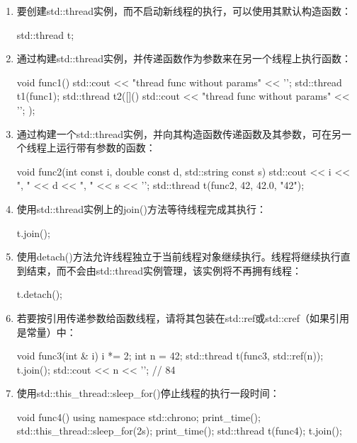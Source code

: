 \begin{enumerate}
\item
要创建std::thread实例，而不启动新线程的执行，可以使用其默认构造函数：

\begin{cpp}
std::thread t;
\end{cpp}

\item
通过构建std::thread实例，并传递函数作为参数来在另一个线程上执行函数：

\begin{cpp}
void func1()
{
    std::cout << "thread func without params" << '\n';
}
std::thread t1(func1);
std::thread t2([]() {
    std::cout << "thread func without params" << '\n'; });
\end{cpp}

\item
通过构建一个std::thread实例，并向其构造函数传递函数及其参数，可在另一个线程上运行带有参数的函数：

\begin{cpp}
void func2(int const i, double const d, std::string const s)
{
    std::cout << i << ", " << d << ", " << s << '\n';
}
std::thread t(func2, 42, 42.0, "42");
\end{cpp}

\item
使用std::thread实例上的join()方法等待线程完成其执行：

\begin{cpp}
t.join();
\end{cpp}

\item
使用detach()方法允许线程独立于当前线程对象继续执行。线程将继续执行直到结束，而不会由std::thread实例管理，该实例将不再拥有线程：

\begin{cpp}
t.detach();
\end{cpp}

\item
若要按引用传递参数给函数线程，请将其包装在std::ref或std::cref（如果引用是常量）中：

\begin{cpp}
void func3(int & i)
{
    i *= 2;
}
int n = 42;
std::thread t(func3, std::ref(n));
t.join();
std::cout << n << '\n'; // 84
\end{cpp}

\item
使用std::this\_thread::sleep\_for()停止线程的执行一段时间：

\begin{cpp}
void func4()
{
    using namespace std::chrono;
    print_time();
    std::this_thread::sleep_for(2s);
    print_time();
}
std::thread t(func4);
t.join();
\end{cpp}


\end{enumerate}

